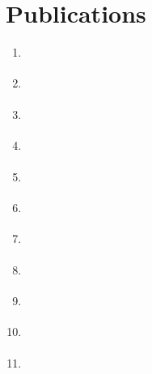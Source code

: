 \normalsize
\vspace{-8mm}
\section{Publications}
\begin{enumerate}

	\item {} \label{ans_2018} \vspace{4mm}
	\item {} \label{cp2017} \vspace{4mm}
	\item {} \label{ans_2017} \vspace{4mm}
	\item {} \label{nair} \vspace{4mm}
	\item {} \label{aries} \vspace{4mm}
	\item {} \label{ans_2013} \vspace{4mm}
	\item {} \label{fy12} \vspace{4mm}
	\item {} \label{mcnp6_um} \vspace{4mm}
	\item {} \label{mst1} \vspace{4mm}
	\item {} \label{mst2} \vspace{4mm}
	\item {} \label{uga} \vspace{4mm}
	
\end{enumerate}



